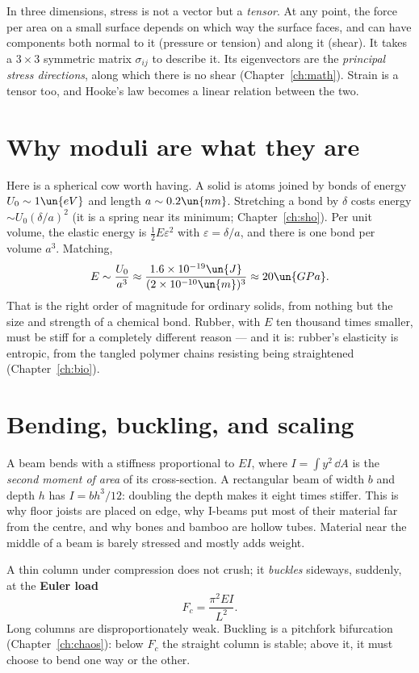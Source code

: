 In three dimensions, stress is not a vector but a \emph{tensor}. At any point, the force per area on a small surface depends on which way the surface faces, and can have components both normal to it (pressure or tension) and along it (shear). It takes a $3\times3$ symmetric matrix $\sigma_{ij}$ to describe it. Its eigenvectors are the \emph{principal stress directions}, along which there is no shear (Chapter~\ref{ch:math}). Strain is a tensor too, and Hooke's law becomes a linear relation between the two.

\section{Why moduli are what they are}

Here is a spherical cow worth having. A solid is atoms joined by bonds of energy $U_0\sim1\un{eV}$ and length $a\sim0.2\un{nm}$. Stretching a bond by $\delta$ costs energy $\sim U_0(\delta/a)^2$ (it is a spring near its minimum; Chapter~\ref{ch:sho}). Per unit volume, the elastic energy is $\tfrac12E\varepsilon^2$ with $\varepsilon = \delta/a$, and there is one bond per volume $a^3$. Matching,
\[
  E\sim\frac{U_0}{a^3}\approx\frac{1.6\times10^{-19}\un{J}}{(2\times10^{-10}\un{m})^3}\approx 20\un{GPa}.
\]
That is the right order of magnitude for ordinary solids, from nothing but the size and strength of a chemical bond. Rubber, with $E$ ten thousand times smaller, must be stiff for a completely different reason --- and it is: rubber's elasticity is entropic, from the tangled polymer chains resisting being straightened (Chapter~\ref{ch:bio}).

\section{Bending, buckling, and scaling}

A beam bends with a stiffness proportional to $EI$, where $I = \int y^2\,\dd A$ is the \emph{second moment of area} of its cross-section. A rectangular beam of width $b$ and depth $h$ has $I = bh^3/12$: doubling the depth makes it eight times stiffer. This is why floor joists are placed on edge, why I-beams put most of their material far from the centre, and why bones and bamboo are hollow tubes. Material near the middle of a beam is barely stressed and mostly adds weight.

A thin column under compression does not crush; it \emph{buckles} sideways, suddenly, at the \textbf{Euler load}
\[
  F_c = \frac{\pi^2EI}{L^2}.
\]
Long columns are disproportionately weak. Buckling is a pitchfork bifurcation (Chapter~\ref{ch:chaos}): below $F_c$ the straight column is stable; above it, it must choose to bend one way or the other.

